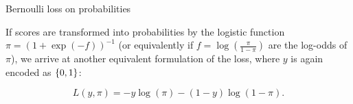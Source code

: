 \documentclass[11pt,compress,t,notes=noshow, xcolor=table]{beamer}
\begin{document}
\begin{vbframe}{Bernoulli loss on probabilities}

If scores are transformed into probabilities by the logistic function  $\pi = \left(1 + \exp(-f)\right)^{-1}$ (or equivalently if $f = \log\left(\frac{\pi}{1 - \pi}\right)$ are the log-odds of $\pi$), we arrive at another equivalent formulation of the loss, where $y$ is again encoded as $\{0, 1\}$:

  $$
    L(y, \pi) = - y \log \left(\pi\right) - (1 - y) \log \left(1 - \pi\right). 
  $$
  
\begin{center}
\begin{figure}
  \\
\end{figure}
\end{center}

\end{vbframe}
\end{document}
